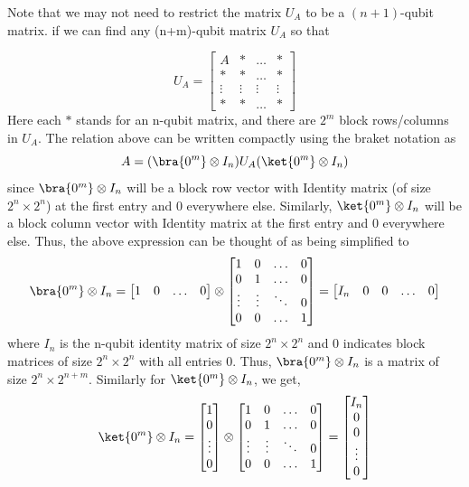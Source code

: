 \documentclass[12pt, oneside]{book}
\theoremstyle{definition}
\theoremstyle{definition}
\theoremstyle{remark}
\begin{document}
Note that we may not need to restrict the matrix $U_A$ to be a $(n+1)$-qubit  matrix. if we can find any (n+m)-qubit matrix $U_A$ so that

\[
U_A=\begin{bmatrix} A & * & \ldots & * \\
* & * & \ldots & * \\
\vdots & \vdots & \vdots & \vdots \\
* & * & \ldots & * \end{bmatrix}
\]
Here each $*$ stands for an n-qubit matrix, and there are $2^m$ block rows/columns in $U_A$. The relation above can be written compactly using the braket notation as
\[
A=(\bra{0^m}\otimes I_n)U_A(\ket{0^m}\otimes I_n)
\]
since $\bra{0^m}\otimes I_n$ will be a block row vector with Identity matrix (of size $2^n \times 2^n$) at the first entry and 0 everywhere else. Similarly, $\ket{0^m} \otimes I_n$ will be a block column vector with Identity matrix at the first entry and 0 everywhere else. Thus, the above expression can be thought of as being simplified to
\[
\bra{0^m}\otimes I_n=\begin{bmatrix} 1 & 0 & \ldots & 0\end{bmatrix} \otimes \begin{bmatrix} 1 & 0 & \ldots & 0 \\ 0 & 1 & \ldots & 0 \\ \vdots & \vdots & \ddots & 0 \\ 0 & 0 & \ldots & 1 \end{bmatrix}=\begin{bmatrix} I_n & 0 & 0 & \ldots & 0 \end{bmatrix}
\]
where $I_n$ is the n-qubit identity matrix of size $2^n\times 2^n$ and $0$ indicates block matrices of size $2^n \times 2^n$ with all entries 0. Thus, $\bra{0^m}\otimes I_n$ is a matrix of size $2^n \times 2^{n+m}$. Similarly for $\ket{0^m} \otimes I_n$, we get,
\[
\ket{0^m}\otimes I_n=\begin{bmatrix} 1 \\ 0 \\ \vdots \\ 0\end{bmatrix} \otimes \begin{bmatrix} 1 & 0 & \ldots & 0 \\ 0 & 1 & \ldots & 0 \\ \vdots & \vdots & \ddots & 0 \\ 0 & 0 & \ldots & 1 \end{bmatrix}=\begin{bmatrix} I_n \\ 0 \\ 0 \\ \vdots \\ 0 \end{bmatrix}
\]
\end{document}
